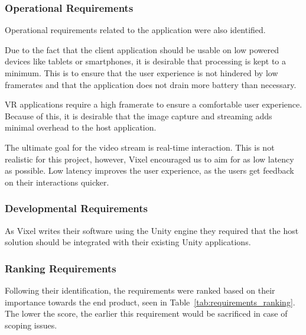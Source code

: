 \subsubsection{Operational Requirements}
Operational requirements related to the application were also identified.

Due to the fact that the client application should be usable on low powered devices like tablets or smartphones, it is desirable that processing is kept to a minimum. This is to ensure that the user experience is not hindered by low framerates and that the application does not drain more battery than necessary.

VR applications require a high framerate to ensure a comfortable user experience\cite{sony_high_fps}. Because of this, it is desirable that the image capture and streaming adds minimal overhead to the host application.

The ultimate goal for the video stream is real-time interaction. This is not realistic for this project, however, Vixel encouraged us to aim for as low latency as possible. Low latency improves the user experience, as the users get feedback on their interactions quicker.

\subsubsection{Developmental Requirements}
As Vixel writes their software using the Unity engine they required that the host solution should be integrated with their existing Unity applications.

\subsubsection{Ranking Requirements}
Following their identification, the requirements were ranked based on their importance towards the end product, seen in Table~\ref{tab:requirements_ranking}. The lower the score, the earlier this requirement would be sacrificed in case of scoping issues.

